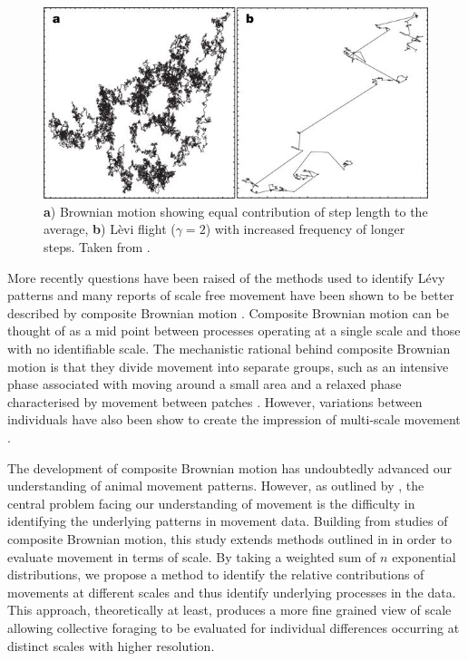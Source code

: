 \documentclass[11pt,usenames,dvipsnames,a4paper]{article}
\begin{document}
\begin{linenumbers}
\begin{figure}[H]
	\centering
	\includegraphics[scale=0.7]{LeviFlight.jpg}
	\caption{\textbf{a}) Brownian motion showing equal contribution of step length to the average, \textbf{b}) L\`evi flight ($\gamma = 2$) with increased frequency of longer steps. Taken from \cite{Barthelemy2008}.}
\end{figure}

More recently questions have been raised of the methods used to identify L\'evy patterns \citep{DeJager2013, Pyke2015, Kolzsch2015, Wosniack2017} and many reports of scale free movement have been shown to be better described by composite Brownian motion \citep{Petrovskii2011, Jansen2012, Gautestad2012, Zhao2016}. Composite Brownian motion can be thought of as a mid point between processes operating at a single scale and those with no identifiable scale. The mechanistic rational behind composite Brownian motion is that they divide movement into separate groups, such as an intensive phase associated with moving around a small area and a relaxed phase characterised by movement between patches \citep{Auger-Methe2015}. However, variations between individuals have also been show to create the impression of multi-scale movement \citep{Petrovskii2011}.

The development of composite Brownian motion has undoubtedly advanced our understanding of animal movement patterns. However, as outlined by \cite{Nathan2008}, the central problem facing our understanding of movement is the difficulty in identifying the underlying patterns in movement data. Building from studies of composite Brownian motion, this study extends methods outlined in \cite{Petrovskii2011} in order to evaluate movement in terms of scale. By taking a weighted sum of $n$ exponential distributions, we propose a method to identify the relative contributions of movements at different scales and thus identify underlying processes in the data. This approach, theoretically at least, produces a more fine grained view of scale allowing collective foraging to be evaluated for individual differences occurring at distinct scales with higher resolution.


\end{linenumbers}
\end{document}
